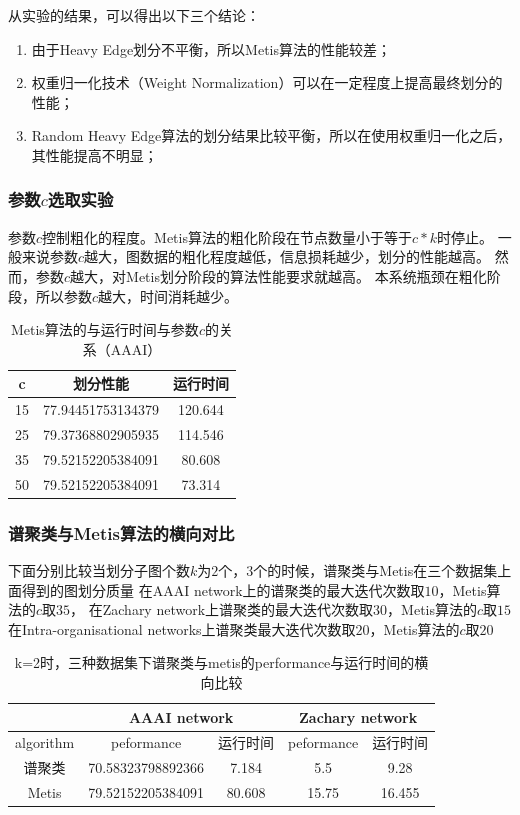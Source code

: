 从实验的结果，可以得出以下三个结论：
\begin{enumerate}
    \item 由于Heavy Edge划分不平衡，所以Metis算法的性能较差；
    \item 权重归一化技术（Weight Normalization）可以在一定程度上提高最终划分的性能；
    \item Random Heavy Edge算法的划分结果比较平衡，所以在使用权重归一化之后，其性能提高不明显；
\end{enumerate}

\subsubsection{参数$c$选取实验}

参数$c$控制粗化的程度。Metis算法的粗化阶段在节点数量小于等于$c*k$时停止。
一般来说参数$c$越大，图数据的粗化程度越低，信息损耗越少，划分的性能越高。
然而，参数$c$越大，对Metis划分阶段的算法性能要求就越高。
本系统瓶颈在粗化阶段，所以参数$c$越大，时间消耗越少。

\begin{table}[htbp]
    \centering
    \begin{tabular}{ccc}
        \hline
        c    &划分性能 &运行时间 \\
        \hline
        15 &77.94451753134379 &120.644 \\
        25 &79.37368802905935 &114.546 \\
        35 &79.52152205384091 &80.608 \\
        50 &79.52152205384091 &73.314 \\
        \hline
    \end{tabular}
    \caption{Metis算法的与运行时间与参数$c$的关系（AAAI）}
\end{table}

\subsubsection{谱聚类与Metis算法的横向对比}

下面分别比较当划分子图个数$k$为$2$个，$3$个的时候，谱聚类与Metis在三个数据集上面得到的图划分质量
在AAAI network上的谱聚类的最大迭代次数取$10$，Metis算法的$c$取$35$，
在Zachary network上谱聚类的最大迭代次数取$30$，Metis算法的$c$取$15$
在Intra-organisational networks上谱聚类最大迭代次数取$20$，Metis算法的$c$取$20$

\begin{table}[htbp]
    \centering
    \begin{tabular}{|c|c|c|c|c|}
        \hline
    &\multicolumn{2}{c|}{AAAI network} &\multicolumn{2}{c|}{Zachary network} \\
        \hline
    algorithm      &peformance           &运行时间   &peformance  &运行时间 \\
        \hline
    谱聚类          &70.58323798892366    &7.184      &5.5      &9.28\\
    Metis           &79.52152205384091    &80.608     &15.75    &16.455\\
        \hline
    \end{tabular}
    \caption{k=2时，三种数据集下谱聚类与metis的performance与运行时间的横向比较}
\end{table}



